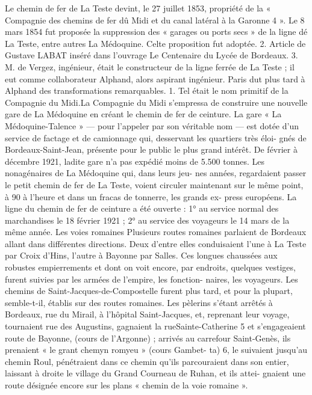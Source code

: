 \documentclass[a4paper,11pt]{book}
\begin{document}
Le chemin de fer de La Teste devint, le 27 juillet 1853,
propriété de la « Compagnie des chemins de fer dû Midi
et du canal latéral à la Garonne 4 ». Le 8 mars 1854 fut
proposée la suppression des « garages ou ports secs » de
la ligne dé La Teste, entre autres La Médoquine. Celte
proposition fut adoptée.
2. Article de Gustave LABAT inséré dans l'ouvrage Le Centenaire du
Lycée de Bordeaux.
3. M. de Vergez, ingénieur, était le constructeur de la ligne ferrée de
La Teste ; il eut comme collaborateur Alphand, alors aspirant ingénieur.
Paris dut plus tard à Alphand des transformations remarquables.
1. Tel était le nom primitif de la Compagnie du Midi.La Compagnie du Midi s'empressa de construire une
nouvelle gare de La Médoquine en créant le chemin de fer
de ceinture.
La gare « La Médoquine-Talence
» — pour l'appeler
par son véritable nom — est dotée d'un service de factage
et de camionnage qui, desservant les quartiers très éloi-
gnés de Bordeaux-Saint-Jean, présente pour le public le
plus grand intérêt.
De février à décembre 1921, ladite gare n'a pas expédié
moins de 5.500 tonnes.
Les nonagénaires de La Médoquine qui, dans leurs jeu-
nes années, regardaient passer le petit chemin de fer de
La Teste, voient circuler maintenant
sur le même point, à
90 à l'heure et dans
un fracas de tonnerre, les grands ex-
press européens.
La ligne du chemin de fer de ceinture a été ouverte :
1° au service normal des marchandises le 18 février 1921
;
2° au service des
voyageurs le 14 mars de la même année.
Les voies romaines
Plusieurs routes romaines parlaient de Bordeaux allant
dans différentes directions. Deux d'entre elles conduisaient
l'une à La Teste
par Croix d'Hins, l'autre à Bayonne par
Salles. Ces longues chaussées aux robustes empierrements
et dont on voit encore, par endroits, quelques vestiges,
furent suivies
par les armées de l'empire, les fonction-
naires, les voyageurs.
Les chemins de Saint-Jacques-de-Compostelle furent
plus tard, et pour la plupart, semble-t-il, établis
sur des
routes romaines. Les pèlerins s'étant arrêtés à Bordeaux,
rue du Mirail, à l'hôpital Saint-Jacques, et, reprenant leur
voyage, tournaient rue des Augustins, gagnaient la rueSainte-Catherine 5 et s'engageaient route de Bayonne,
(cours de l'Argonne) ; arrivés au carrefour Saint-Genès,
ils prenaient « le grant chemyn romyeu » (cours Gambet-
ta) 6, le suivaient jusqu'au chemin Roul, pénétraient dans
ce chemin qu'ils parcouraient dans son entier, laissant à
droite le village du Grand Courneau de Ruhan, et ils attei-
gnaient une route désignée encore sur les plans « chemin
de la voie romaine ».
\end{document}
